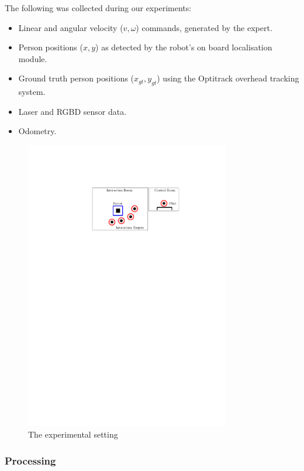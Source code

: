 \documentclass[a4paper,11pt]{report}
\begin{document}
The following was collected during our experiments:

\begin{itemize}
	\item Linear and angular velocity ($v,\omega$) commands, generated by the expert. 
	\item Person positions  ($x,y$) as detected by the robot's on board localisation module.
	\item Ground truth person positions ($x_{gt},y_{gt}$) using the Optitrack overhead tracking system.
	\item Laser and RGBD sensor data.
	\item Odometry.
\end{itemize}

	\begin{figure}
	\centering
	    \includegraphics[width=0.8\textwidth]{figures/experiment.pdf}
	  \caption[Experimental Setting]{The experimental setting}
	  \label{fig:experiment}
	\end{figure}

\subsubsection{Processing}
\end{document}
